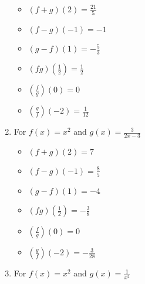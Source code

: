 \begin{enumerate}
\begin{multicols}{3}
\begin{itemize}

\item  $(f+g)(2) = \frac{21}{5}$
\item  $(f-g)(-1) = -1$
\item  $(g-f)(1) = -\frac{5}{3}$

\end{itemize}
\end{multicols}

\begin{multicols}{3}
\begin{itemize}

\item  $(fg)\left(\frac{1}{2}\right) = \frac{1}{2}$
\item  $\left(\frac{f}{g}\right)(0) = 0$
\item  $\left(\frac{g}{f}\right)\left(-2\right) = \frac{1}{12}$

\end{itemize}
\end{multicols}

\item For  $f(x) = x^2$ and $g(x) = \frac{3}{2x-3}$

\begin{multicols}{3}
\begin{itemize}

\item  $(f+g)(2) = 7$
\item  $(f-g)(-1) = \frac{8}{5}$
\item  $(g-f)(1) = -4$

\end{itemize}
\end{multicols}

\begin{multicols}{3}
\begin{itemize}

\item  $(fg)\left(\frac{1}{2}\right) = -\frac{3}{8}$
\item  $\left(\frac{f}{g}\right)(0) = 0$
\item  $\left(\frac{g}{f}\right)\left(-2\right) = -\frac{3}{28}$

\end{itemize}
\end{multicols}

\item For  $f(x) = x^2$ and $g(x) = \frac{1}{x^2}$


\end{enumerate}
